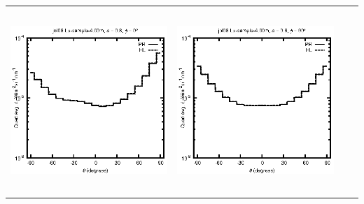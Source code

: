 \begin{tabular}{c c c c}
\includegraphics[height=7cm]{../eps/jol08_Lu_sample_4.00m_fwd.eps} &
\includegraphics[height=7cm]{../eps/jol08_Lu_sample_4.00m_cross.eps} \\
\end{tabular}

\pagebreak

